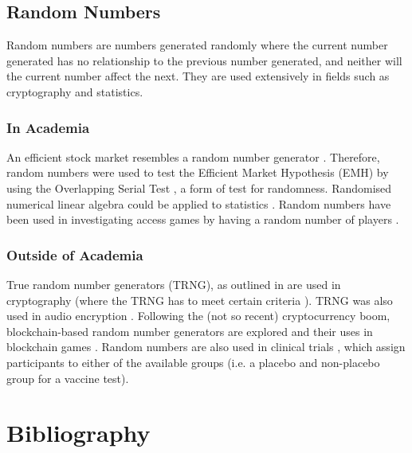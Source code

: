 \documentclass[10pt, twocolumn]{article}
\begin{document}
\subsection{Random Numbers} %
Random numbers are numbers generated randomly where the current number generated has no relationship to the previous number generated, and neither will the current number affect the next. They are used extensively in fields such as cryptography and statistics.

\subsubsection{In Academia}
An efficient stock market resembles a random number generator \cite{Doyle2013}. Therefore, random numbers were used to test the Efficient Market Hypothesis (EMH) \cite{Yen2008} by using the Overlapping Serial Test \cite{Good1953}, a form of test for randomness. Randomised numerical linear algebra \cite{Martinsson2020} could be applied to statistics \cite{Gentle2012}. Random numbers have been used in investigating access games by having a random number of players \cite{Tembine2008}.

\subsubsection{Outside of Academia} %
True random number generators (TRNG), as outlined in \cite{Sunar2009} are used in cryptography (where the TRNG has to meet certain criteria \cite{Latham2001}). TRNG was also used in audio encryption \cite{Etem2020}. Following the (not so recent) cryptocurrency boom, blockchain-based random number generators \cite{Hsieh2022} are explored and their uses in blockchain games \cite{Du2019}. Random numbers are also used in clinical trials \cite{Beller2002}, which assign participants to either of the available groups (i.e. a placebo and non-placebo group for a vaccine test).

\newpage
\section{Bibliography}



\onecolumn
\newpage
\end{document}
